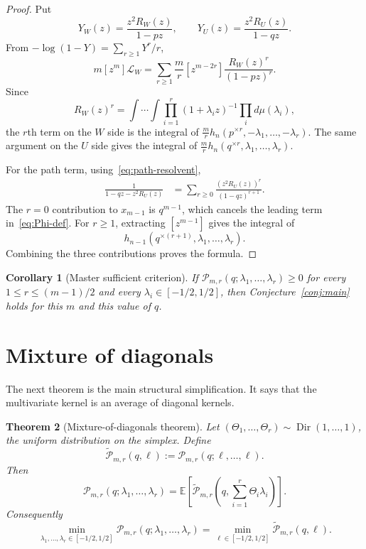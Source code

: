 \documentclass[11pt]{article}
\newtheorem{theorem}{Theorem}[section]
\newtheorem{corollary}[theorem]{Corollary}
\newcommand{\E}{\mathbb E}
\newcommand{\Pcal}{\mathcal P}
\newcommand{\wtP}{\widetilde{\mathcal P}}
\newcommand{\Dir}{\operatorname{Dir}}
\begin{document}
\begin{proof}
Put
\[
        Y_W(z)=\frac{z^2R_W(z)}{1-pz},
        \qquad
        Y_U(z)=\frac{z^2R_U(z)}{1-qz}.
\]
From $-\log(1-Y)=\sum_{r\ge1}Y^r/r$,
\[
        m[z^m]\mathcal L_W
        =\sum_{r\ge1}\frac mr[z^{m-2r}]\frac{R_W(z)^r}{(1-pz)^r}.
\]
Since
\[
        R_W(z)^r=\int\cdots\int\prod_{i=1}^r(1+\lambda_iz)^{-1}\prod_i d\mu(\lambda_i),
\]
the $r$th term on the $W$ side is the integral of $\frac mr h_n(p^{\times r},-\lambda_1,\ldots,-\lambda_r)$.  The same argument on the $U$ side gives the integral of $\frac mr h_n(q^{\times r},\lambda_1,\ldots,\lambda_r)$.

For the path term, using~\eqref{eq:path-resolvent},
\[
\begin{aligned}
        \frac1{1-qz-z^2R_U(z)}
        &=\sum_{r\ge0}\frac{(z^2R_U(z))^r}{(1-qz)^{r+1}}.
\end{aligned}
\]
The $r=0$ contribution to $x_{m-1}$ is $q^{m-1}$, which cancels the leading term in~\eqref{eq:Phi-def}.  For $r\ge1$, extracting $[z^{m-1}]$ gives the integral of
\[
        h_{n-1}(q^{\times(r+1)},\lambda_1,\ldots,\lambda_r).
\]
Combining the three contributions proves the formula.
\end{proof}

\begin{corollary}[Master sufficient criterion]\label{cor:master}
If $\Pcal_{m,r}(q;\lambda_1,\ldots,\lambda_r)\ge0$ for every $1\le r\le(m-1)/2$ and every $\lambda_i\in[-1/2,1/2]$, then Conjecture~\ref{conj:main} holds for this $m$ and this value of $q$.
\end{corollary}

\section{Mixture of diagonals}\label{sec:mixture}

The next theorem is the main structural simplification.  It says that the multivariate kernel is an average of diagonal kernels.

\begin{theorem}[Mixture-of-diagonals theorem]\label{thm:mixture}
Let $(\Theta_1,\ldots,\Theta_r)\sim\Dir(1,\ldots,1)$, the uniform distribution on the simplex.  Define
\[
        \wtP_{m,r}(q,\ell):=\Pcal_{m,r}(q;\ell,\ldots,\ell).
\]
Then
\begin{equation}\label{eq:mixture}
        \Pcal_{m,r}(q;\lambda_1,\ldots,\lambda_r)
        =\E\left[\wtP_{m,r}\left(q,\sum_{i=1}^r\Theta_i\lambda_i\right)\right].
\end{equation}
Consequently
\[
        \min_{\lambda_1,\ldots,\lambda_r\in[-1/2,1/2]}
        \Pcal_{m,r}(q;\lambda_1,\ldots,\lambda_r)
        =\min_{\ell\in[-1/2,1/2]}\wtP_{m,r}(q,\ell).
\]
\end{theorem}
\end{document}
